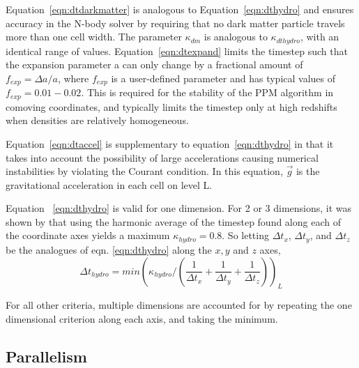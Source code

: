Equation~\ref{eqn:dtdarkmatter} is analogous to Equation~\ref{eqn:dthydro} and ensures
accuracy in the N-body solver by requiring that no dark matter particle travels more than
one cell width.  The parameter $\kappa_{dm}$ is analogous to $\kappa_{dthydro}$, with
an identical range of values.  Equation~\ref{eqn:dtexpand} limits the timestep such 
that the expansion parameter a can only change by a fractional amount of $f_{exp} = \Delta a/a$, 
where $f_{exp}$ is a user-defined parameter and has typical values of $f_{exp} = 0.01-0.02$.
This is required for the stability of the PPM algorithm in comoving coordinates, and
typically limits the timestep only at high redshifts when densities are relatively
homogeneous.

Equation~\ref{eqn:dtaccel} is supplementary to equation~\ref{eqn:dthydro} in that it
takes into account the possibility of large accelerations causing numerical 
instabilities by violating the Courant condition.  In this equation, $\vec{g}$ is the
gravitational acceleration in each cell on level L.  

Equation ~\ref{eqn:dthydro} is valid for one dimension.  For 2 or 3
dimensions, it was shown by \cite{Godunov1959}  that using the
harmonic average of the timestep found along each of the coordinate
axes yields a maximum $\kappa_{hydro} = 0.8$.  So letting $\Delta
t_x$, $\Delta t_y$, and $\Delta t_z$ be the analogues of
eqn. \ref{eqn:dthydro} along the $x,y$ and $z$ axes, 
\begin{equation}
\Delta t_{hydro} = min ( \kappa_{hydro} /( \frac{1}{\Delta t_x}
+\frac{1}{\Delta t_y} + \frac{1}{\Delta t_z} ) )_L
\end{equation}

For all other criteria, multiple dimensions are accounted for by
repeating the one dimensional criterion along each axis, and taking
the minimum.


\subsection{Parallelism}\label{sec.ov.parallel}

